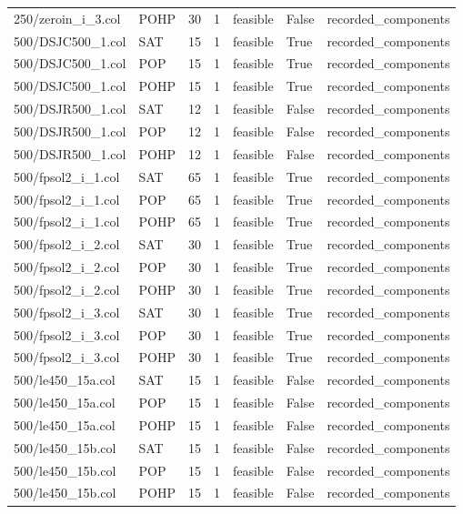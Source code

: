 \begin{table}[htbp]
\begin{tabular}{lllllll}
250/zeroin\_i\_3.col & POHP & 30 & 1 & feasible & False & recorded\_components \\
500/DSJC500\_1.col & SAT & 15 & 1 & feasible & True & recorded\_components \\
500/DSJC500\_1.col & POP & 15 & 1 & feasible & True & recorded\_components \\
500/DSJC500\_1.col & POHP & 15 & 1 & feasible & True & recorded\_components \\
500/DSJR500\_1.col & SAT & 12 & 1 & feasible & False & recorded\_components \\
500/DSJR500\_1.col & POP & 12 & 1 & feasible & False & recorded\_components \\
500/DSJR500\_1.col & POHP & 12 & 1 & feasible & False & recorded\_components \\
500/fpsol2\_i\_1.col & SAT & 65 & 1 & feasible & True & recorded\_components \\
500/fpsol2\_i\_1.col & POP & 65 & 1 & feasible & True & recorded\_components \\
500/fpsol2\_i\_1.col & POHP & 65 & 1 & feasible & True & recorded\_components \\
500/fpsol2\_i\_2.col & SAT & 30 & 1 & feasible & True & recorded\_components \\
500/fpsol2\_i\_2.col & POP & 30 & 1 & feasible & True & recorded\_components \\
500/fpsol2\_i\_2.col & POHP & 30 & 1 & feasible & True & recorded\_components \\
500/fpsol2\_i\_3.col & SAT & 30 & 1 & feasible & True & recorded\_components \\
500/fpsol2\_i\_3.col & POP & 30 & 1 & feasible & True & recorded\_components \\
500/fpsol2\_i\_3.col & POHP & 30 & 1 & feasible & True & recorded\_components \\
500/le450\_15a.col & SAT & 15 & 1 & feasible & False & recorded\_components \\
500/le450\_15a.col & POP & 15 & 1 & feasible & False & recorded\_components \\
500/le450\_15a.col & POHP & 15 & 1 & feasible & False & recorded\_components \\
500/le450\_15b.col & SAT & 15 & 1 & feasible & False & recorded\_components \\
500/le450\_15b.col & POP & 15 & 1 & feasible & False & recorded\_components \\
500/le450\_15b.col & POHP & 15 & 1 & feasible & False & recorded\_components \\

\end{tabular}
\end{table}
